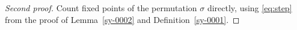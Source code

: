 \begin{proof}[Second proof]\label{sy-0005}
Count fixed points of the permutation $\sigma$ directly, using \eqref{eq:step} from the proof of Lemma~\ref{sy-0002} and Definition~\ref{sy-0001}.
\end{proof}
